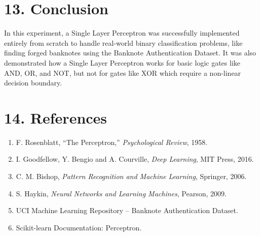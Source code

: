 \documentclass[11pt]{article}
\begin{document}
\section*{13. Conclusion}
In this experiment, a Single Layer Perceptron was successfully implemented entirely from scratch to handle real-world binary classification problems, like finding forged banknotes using the Banknote Authentication Dataset. It was also demonstrated how a Single Layer Perceptron works for basic logic gates like AND, OR, and NOT, but not for gates like XOR which require a non-linear decision boundary.


\section*{14. References}

\begin{enumerate}
\item F. Rosenblatt, ``The Perceptron,'' \emph{Psychological Review}, 1958.
\item I. Goodfellow, Y. Bengio and A. Courville, \emph{Deep Learning}, MIT Press, 2016.
\item C. M. Bishop, \emph{Pattern Recognition and Machine Learning}, Springer, 2006.
\item S. Haykin, \emph{Neural Networks and Learning Machines}, Pearson, 2009.
\item UCI Machine Learning Repository -- Banknote Authentication Dataset.
\item Scikit-learn Documentation: Perceptron.
\end{enumerate}
\end{document}
